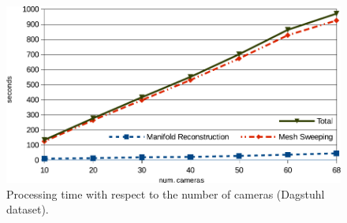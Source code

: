 \begin{figure}[t]
\centering
\includegraphics[width=0.99\columnwidth]{./img/timing}
\caption{Processing time with respect to the number of cameras (Dagstuhl dataset).}
\label{fig:scalability}
\end{figure}

